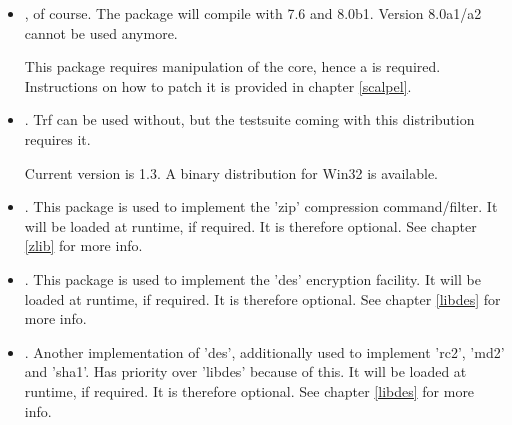 \documentclass {report}
\begin{document}
\begin{itemize}
\item	\strong {\tcl}, of course. The package will compile with 7.6
	and 8.0b1. Version 8.0a1/a2 cannot be used anymore.

	This package requires manipulation of the core, hence a
	 is required. Instructions on how
	to patch it is provided in chapter \ref {scalpel}.

\item	{}. Trf can be used without, but the
	testsuite coming with this distribution requires it.

	Current version is 1.3. A binary distribution for Win32 is
	available.


	
\item	\strong {\zlib}. This package is used to implement the 'zip'
	compression command/filter. It will be loaded at runtime, if
	required. It is therefore optional. See chapter \ref {zlib} for
	more info.

\item	{}. This package is used to implement the 'des'
	encryption facility. It will be loaded at runtime, if
	required. It is therefore optional. See chapter \ref {libdes}
	for more info.

\item	\strong {\SSLeay}. Another implementation of 'des',
	additionally used to implement 'rc2', 'md2' and 'sha1'. Has
	priority over 'libdes' because of this. It will be loaded at
	runtime, if required. It is therefore optional. See chapter
	\ref {libdes} for more info.
\end{itemize}
\end{document}
